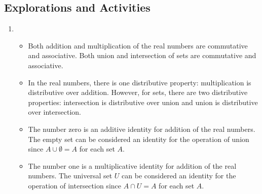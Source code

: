 \begin{enumerate}
\begin{enumerate}
\end{enumerate}
\end{enumerate}



\subsection*{Explorations and Activities}
\setcounter{oldenumi}{\theenumi}
\begin{enumerate} \setcounter{enumi}{\theoldenumi}
\item \begin{itemize}
\item Both addition and multiplication of the real numbers are commutative and associative.  Both union and intersection of sets are commutative and associative.

\item In the real numbers, there is one distributive property:  multiplication is distributive over addition.  However, for sets, there are two distributive properties:  intersection is distributive over union and union is distributive over intersection.

\item The number zero is an additive identity for addition of the real numbers.  The empty set can be considered an identity for the operation of union since  $A \cup \emptyset  = A$ 
for each set  $A$.

\item The number one is a multiplicative identity for addition of the real numbers.  The universal set  $U$  can be considered an identity for the operation of intersection since  $A \cap U = A$
for each set  $A$.
\end{itemize}

\end{enumerate}

\hbreak

\endinput


